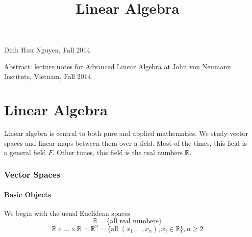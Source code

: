 \documentclass[12pt]{amsart}
\title{Linear Algebra}
\theoremstyle{definition}
\begin{document}
\maketitle

\begin{center}Dinh Huu Nguyen, Fall 2014\end{center}
\vspace{20pt}

Abstract: lecture notes for Advanced Linear Algebra at John von Neumann Institute, Vietnam, Fall 2014.

\tableofcontents
\part{Linear Algebra} Linear algebra is central to both pure and applied mathematics. We study vector spaces and linear maps between them over a field. Most of the times, this field is a general field $F$. Other times, this field is the real numbers $\mathbb{R}$.

\section{Vector Spaces}
\subsection{Basic Objects} We begin with the usual Euclidean spaces
$$\mathbb{R} = \{\text{all real numbers}\}$$
$$\mathbb{R} \times \ldots \times \mathbb{R} = \mathbb{R}^n = \{\text{all } (x_1, \dots , x_n), x_i \in \mathbb{R}\}, n \geq 2$$
\end{document}
